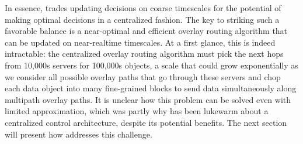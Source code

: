 In essence, \name trades updating decisions on coarse timescales
for the potential of making optimal decisions in a centralized
fashion.
The key to striking such a favorable balance is a
near-optimal and efficient overlay routing
algorithm that can be updated on near-realtime timescales.
At a first glance, this is indeed intractable:
the centralized overlay routing algorithm must pick the next hops
from 10,000s servers for 100,000s objects, a scale that could
grow exponentially as we consider all possible
overlay paths that go through these servers and chop each data
object into many fine-grained blocks to send data simultaneously along
multipath overlay paths.
It is unclear how this problem can be solved even with
limited approximation, which was partly why \company has been lukewarm
about a centralized control architecture, despite its potential benefits.
The next section  will present how \name addresses this
challenge.


%
%
%
%
%
%



